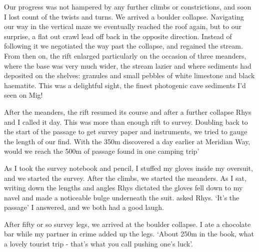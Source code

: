 Our progress was not hampered by any further climbs or constrictions, and soon I lost count of the twists and turns. We arrived a boulder collapse. Navigating our way in the vertical maze we eventually reached the roof again, but to our surprise, a flat out crawl lead off back in the opposite direction. Instead of following it we negotiated the way past the collapse, and regained the stream. From then on, the rift enlarged particularly on the occasion of three meanders, where the base was very much wider, the stream lazier and where sediments had deposited on the shelves: granules and small pebbles of white limestone and black haematite. This was a delightful sight, the finest photogenic cave sediments I'd seen on Mig!

After the meanders, the rift resumed its course and after a further collapse Rhys and I called it day. This was more than enough rift to survey. Doubling back to the start of the passage to get survey paper and instruments, we tried to gauge the length of our find. With the 350m discovered a day earlier at Meridian Way, would we reach the 500m of passage found in one camping trip'


As I took the survey notebook and pencil, I stuffed my gloves inside my oversuit, and we started the survey. After the climbs, we started the meanders. As I sat, writing down the lengths and angles Rhys dictated the gloves fell down to my navel and made a noticeable bulge underneath the suit.
 asked Rhys.
`It's the passage' I answered, and we both had a good laugh.

After fifty or so survey legs, we arrived at the boulder collapse. I ate a chocolate bar while my partner in crime added up the legs. `About 250m in the book, what a lovely tourist trip - that's what you call pushing one's luck'.

